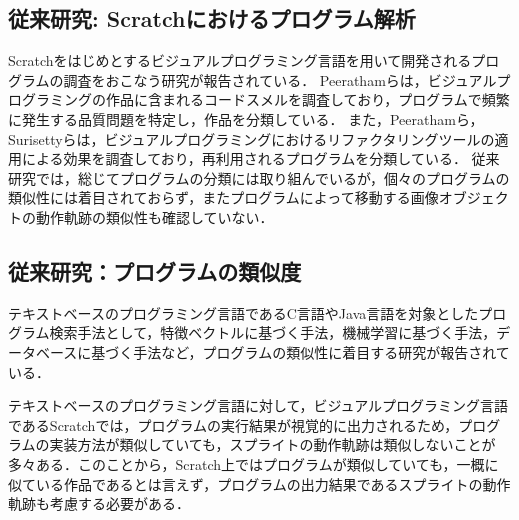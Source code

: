 \documentclass[T,J]{fose} %
\newcommand{\todo}[1]{\colorbox{yellow}{{\bf TODO}:}{\color{red} {\textbf{[#1]}}}}
\begin{document}
\subsection{従来研究: Scratchにおけるプログラム解析}\label{subsec:analyze-scratch}

Scratchをはじめとするビジュアルプログラミング言語を用いて開発されるプログラムの調査をおこなう研究が報告されている\cite{Talbot_2020}．
Peeratham\cite{Understanding}らは，ビジュアルプログラミングの作品に含まれるコードスメルを調査しており，プログラムで頻繁に発生する品質問題を特定し，作品を分類している．
また，Peeratham\cite{techapalokul2019code}ら，Surisettyら\cite{Surisetty_2015}は，ビジュアルプログラミングにおけるリファクタリングツールの適用による効果を調査しており，再利用されるプログラムを分類している．
従来研究では，総じてプログラムの分類には取り組んでいるが，個々のプログラムの類似性には着目されておらず，またプログラムによって移動する画像オブジェクトの動作軌跡の類似性も確認していない．

\subsection{従来研究：プログラムの類似度}\label{subsec:similarity of scratch}
テキストベースのプログラミング言語であるC言語やJava言語を対象としたプログラム検索手法として，特徴ベクトルに基づく手法，機械学習に基づく手法，データベースに基づく手法など，プログラムの類似性に着目する研究が報告されている\cite{Grazia_2023}．

テキストベースのプログラミング言語に対して，ビジュアルプログラミング言語であるScratchでは，プログラムの実行結果が視覚的に出力されるため，プログラムの実装方法が類似していても，スプライトの動作軌跡は類似しないことが多々ある．このことから，Scratch上ではプログラムが類似していても，一概に似ている作品であるとは言えず，プログラムの出力結果であるスプライトの動作軌跡も考慮する必要がある．

\end{document}
